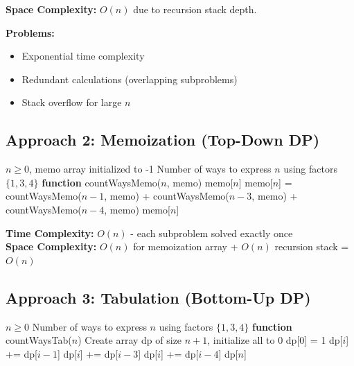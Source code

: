 \documentclass[12pt,a4paper]{article}
\begin{document}
\textbf{Space Complexity:} $O(n)$ due to recursion stack depth.

\textbf{Problems:}
\begin{itemize}
\item Exponential time complexity
\item Redundant calculations (overlapping subproblems)
\item Stack overflow for large $n$
\end{itemize}

\subsection{Approach 2: Memoization (Top-Down DP)}

\begin{algorithm}
\caption{Number Factor - Memoization}
\begin{algorithmic}
\REQUIRE $n \geq 0$, memo array initialized to -1
\ENSURE Number of ways to express $n$ using factors $\{1, 3, 4\}$
\STATE \textbf{function} countWaysMemo($n$, memo)
\ENDIF
{}
\ENDIF
{}
    \RETURN memo[$n$]
\ENDIF
\STATE memo[$n$] = countWaysMemo($n-1$, memo) + countWaysMemo($n-3$, memo) + countWaysMemo($n-4$, memo)
\RETURN memo[$n$]
\end{algorithmic}
\end{algorithm}

\textbf{Time Complexity:} $O(n)$ - each subproblem solved exactly once \\
\textbf{Space Complexity:} $O(n)$ for memoization array + $O(n)$ recursion stack = $O(n)$

\subsection{Approach 3: Tabulation (Bottom-Up DP)}

\begin{algorithm}
\caption{Number Factor - Tabulation}
\begin{algorithmic}
\REQUIRE $n \geq 0$
\ENSURE Number of ways to express $n$ using factors $\{1, 3, 4\}$
\STATE \textbf{function} countWaysTab($n$)
\STATE Create array dp of size $n+1$, initialize all to 0
\STATE dp[0] = 1
        \STATE dp[$i$] += dp[$i-1$]
    \ENDIF
        \STATE dp[$i$] += dp[$i-3$]
    \ENDIF
        \STATE dp[$i$] += dp[$i-4$]
    \ENDIF
\ENDFOR
\RETURN dp[$n$]
\end{algorithmic}
\end{algorithm}
\end{document}
